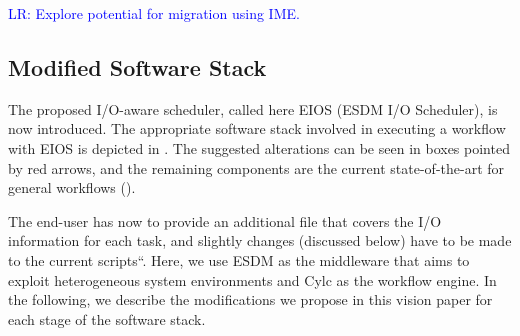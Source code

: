\documentclass{superfri}
\newcommand{\lr}[1]{\textcolor{blue}{LR: #1}}
\begin{document}
\lr{Explore potential for migration using IME.}

\subsection{Modified Software Stack}

The proposed I/O-aware scheduler, called here EIOS (ESDM I/O Scheduler), is now introduced.
The appropriate software stack involved in executing a workflow with EIOS is depicted in .
The suggested alterations can be seen in boxes pointed by red arrows, and the remaining components are the current state-of-the-art for general workflows ().

The end-user has now to provide an additional file that covers the I/O information for each task, and slightly changes (discussed below) have to be made to the current scripts``.
Here, we use ESDM as the middleware that aims to exploit heterogeneous system environments and Cylc as the workflow engine.
In the following, we describe the modifications we propose in this vision paper for each stage of the software stack.

\end{document}
